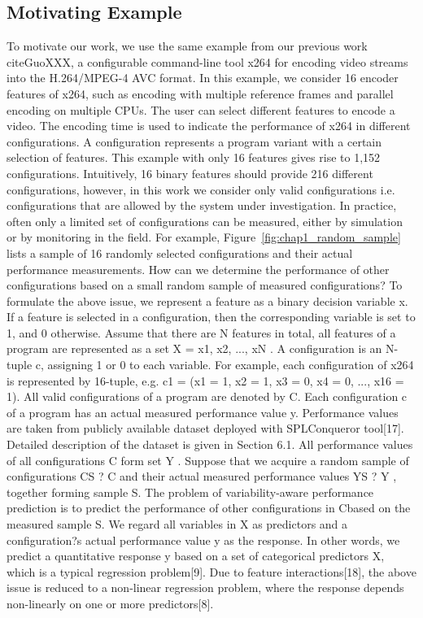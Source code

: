 \subsection{Motivating Example}
To motivate our work, we use the same example from our previous work citeGuoXXX, a configurable
command-line tool x264 for encoding video streams into the H.264/MPEG-4 AVC format.
In this example, we consider 16 encoder features of x264, such as encoding with multiple
reference frames and parallel encoding on multiple CPUs. The user can select
different features to encode a video. The encoding time is used to indicate the performance
of x264 in different configurations. A configuration represents a program variant with
a certain selection of features. This example with only 16 features gives rise to 1,152
configurations. Intuitively, 16 binary features should provide 216 different configurations,
however, in this work we consider only valid configurations i.e. configurations that are
allowed by the system under investigation.
In practice, often only a limited set of configurations can be measured, either by simulation
or by monitoring in the field. For example, Figure~\ref{fig:chap1_random_sample} lists a sample of 16 randomly selected
configurations and their actual performance measurements. How can we determine
the performance of other configurations based on a small random sample of measured configurations?
To formulate the above issue, we represent a feature as a binary decision variable x.
If a feature is selected in a configuration, then the corresponding variable is set to 1, and
0 otherwise. Assume that there are N features in total, all features of a program are
represented as a set X = {x1, x2, ..., xN }. A configuration is an N-tuple c, assigning 1 or 0
to each variable. For example, each configuration of x264 is represented by 16-tuple, e.g.
c1 = (x1 = 1, x2 = 1, x3 = 0, x4 = 0, ..., x16 = 1). All valid configurations of a program are
denoted by C.
Each configuration c of a program has an actual measured performance value y. Performance values are taken from publicly available dataset deployed with SPLConqueror
tool[17]. Detailed description of the dataset is given in Section 6.1.
All performance values of all configurations C form set Y . Suppose that we acquire a
random sample of configurations CS ? C and their actual measured performance values
YS ? Y , together forming sample S. The problem of variability-aware performance prediction
is to predict the performance of other configurations in C\CS based on the measured
sample S.
We regard all variables in X as predictors and a configuration?s actual performance
value y as the response. In other words, we predict a quantitative response y based on a
set of categorical predictors X, which is a typical regression problem[9]. Due to feature
interactions[18], the above issue is reduced to a non-linear regression problem, where the
response depends non-linearly on one or more predictors[8].













